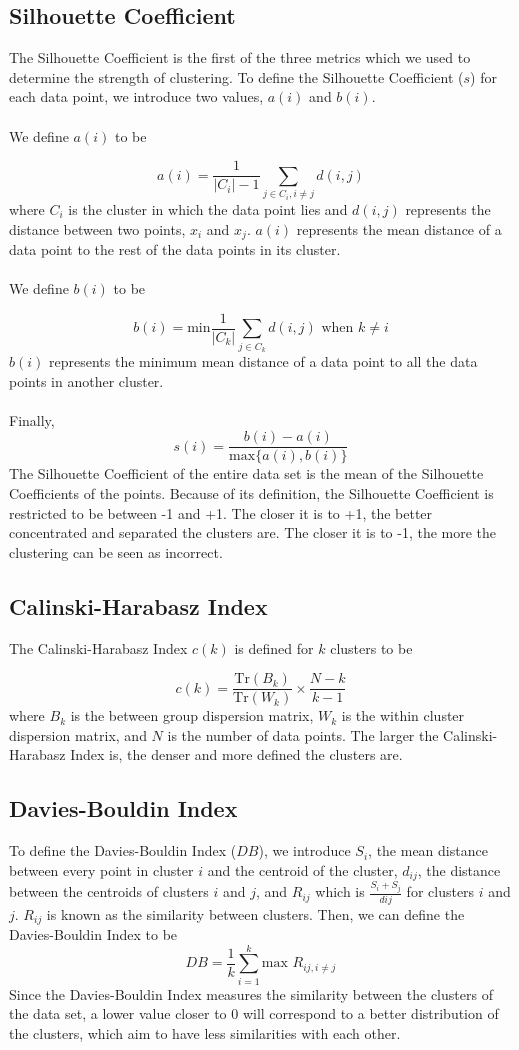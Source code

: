 \documentclass[11pt]{article}
\theoremstyle{definition}
\begin{document}
\subsection{Silhouette Coefficient}
The Silhouette Coefficient is the first of the three metrics which we used to determine the strength of clustering. To define the Silhouette Coefficient ($s$) for each data point, we introduce two values, $a(i)$ and $b(i)$.
\\
\\
We define $a(i)$ to be

$$a(i)=\frac{1}{|C_i|-1}\sum_{j\in{C_i},i{\neq}j}^{} d(i,j)$$
where $C_i$ is the cluster in which the data point lies and $d(i,j)$ represents the distance between two points, $x_i$ and $x_j$. $a(i)$ represents the mean distance of a data point to the rest of the data points in its cluster.
\\
\\
We define $b(i)$ to be

$$b(i) = \text{min} \frac{1}{|C_k|}\sum_{j\in{C_k}}^{} d(i,j) \text{ when } k\neq{i}$$
$b(i)$ represents the minimum mean distance of a data point to all the data points in another cluster. 
\\
\\
Finally, 
$$s(i) = \frac{b(i)-a(i)}{\text{max}\{a(i),b(i)\}}$$
The Silhouette Coefficient of the entire data set is the mean of the Silhouette Coefficients of the points. 
Because of its definition, the Silhouette Coefficient is restricted to be between -1 and +1. The closer it is to +1, the better concentrated and separated the clusters are. The closer it is to -1, the more the clustering can be seen as incorrect. 

\subsection{Calinski-Harabasz Index}
The Calinski-Harabasz Index $c(k)$ is defined for $k$ clusters to be

$$c(k)=\frac{\text{Tr}(B_k)}{\text{Tr}(W_k)} \times \frac{N-k}{k-1}$$ where $B_k$ is the between group dispersion matrix, $W_k$ is the within cluster dispersion matrix, and $N$ is the number of data points.
The larger the Calinski-Harabasz Index is, the denser and more defined the clusters are. 

\subsection{Davies-Bouldin Index}
To define the Davies-Bouldin Index ($DB$), we introduce $S_i$, the mean distance between every point in cluster $i$ and the centroid of the cluster, $d_{ij}$, the distance between the centroids of clusters $i$ and $j$, and $R_{ij}$ which is $\frac{S_i+S_j}{d{ij}}$ for clusters $i$ and $j$. $R_{ij}$ is known as the similarity between clusters. Then, we can define the Davies-Bouldin Index to be
$$DB = \frac{1}{k}\sum_{i=1}^{k}\text{max }R_{ij, i\neq{j}}$$
Since the Davies-Bouldin Index measures the similarity between the clusters of the data set, a lower value closer to 0 will correspond to a better distribution of the clusters, which aim to have less similarities with each other.
\end{document}
